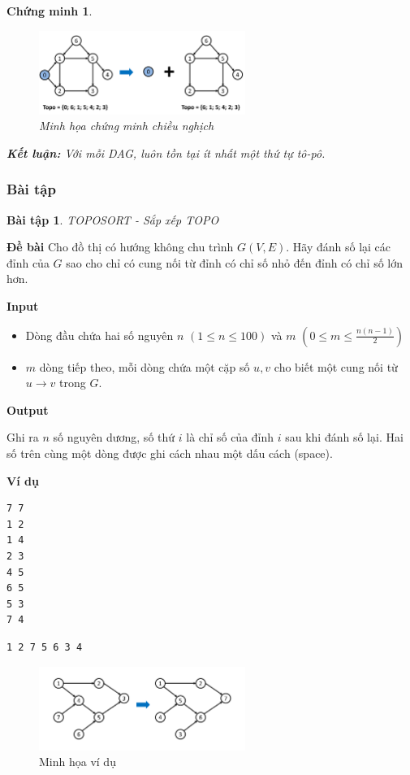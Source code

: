 \documentclass{article}
\newtheorem{chungminh}{Chứng minh}
\newtheorem{baitap}{Bài tập}
\begin{document}
\begin{chungminh}
\begin{figure}[H]
    \centering
    \includegraphics[width=0.6\textwidth]{img/b2/topological_sort_img2.png}
    \caption{Minh họa chứng minh chiều nghịch}
\end{figure}
\textbf{Kết luận:} Với mỗi DAG, luôn tồn tại ít nhất một thứ tự tô-pô.
\end{chungminh}

\subsubsection{Bài tập}
\begin{baitap}
    TOPOSORT - Sắp xếp TOPO
\end{baitap}

\textbf{Đề bài}
Cho đồ thị có hướng không chu trình $G(V, E)$. Hãy đánh số lại các đỉnh của $G$ sao cho chỉ có cung nối từ đỉnh có chỉ số nhỏ đến đỉnh có chỉ số lớn hơn.

\textbf{Input}

\begin{itemize}
    \item Dòng đầu chứa hai số nguyên $n$ $(1 \leq n \leq 100)$ và $m$ $(0 \leq m \leq \frac{n(n-1)}{2})$
    \item $m$ dòng tiếp theo, mỗi dòng chứa một cặp số $u, v$ cho biết một cung nối từ $u \rightarrow v$ trong $G$.
\end{itemize}

\textbf{Output}

Ghi ra $n$ số nguyên dương, số thứ $i$ là chỉ số của đỉnh $i$ sau khi đánh số lại. Hai số trên cùng một dòng được ghi cách nhau một dấu cách (space).

\textbf{Ví dụ}

\begin{lstlisting}[caption={Input}]
7 7
1 2
1 4
2 3
4 5
6 5
5 3
7 4 
\end{lstlisting}

\begin{lstlisting}[caption={Output}]
1 2 7 5 6 3 4
\end{lstlisting}

\begin{figure}[H]
    \centering
    \includegraphics[width=0.6\textwidth]{img/b2/topological_sort_img3.png}
    \caption{Minh họa ví dụ}
\end{figure}
\end{document}
